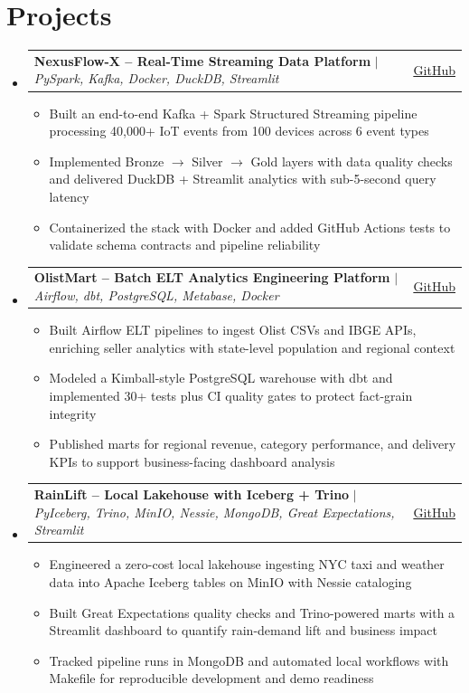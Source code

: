 \documentclass[letterpaper,11pt]{article}
\makeatletter
\newcommand{\resumeItem}[1]{
  \item\small{
    {#1 \vspace{-2pt}}
  }
}
\newcommand{\resumeProjectHeading}[2]{
    \item
    \begin{tabular*}{0.97\textwidth}{l@{\extracolsep{\fill}}r}
      \small#1 & #2 \\
    \end{tabular*}\vspace{-7pt}
}
\newcommand{\resumeSubHeadingListStart}{\begin{itemize}[leftmargin=0.15in, label={}]}
\newcommand{\resumeSubHeadingListEnd}{\end{itemize}}
\newcommand{\resumeItemListStart}{\begin{itemize}[leftmargin=0.18in, itemsep=1pt, topsep=2pt]}
\newcommand{\resumeItemListEnd}{\end{itemize}\vspace{-5pt}}
\makeatother
\begin{document}
\section{Projects}
    \resumeSubHeadingListStart
      \resumeProjectHeading
          {\textbf{NexusFlow-X -- Real-Time Streaming Data Platform} $|$ \emph{PySpark, Kafka, Docker, DuckDB, Streamlit}}{\href{https://github.com/sauravpatel0512}{\underline{GitHub}}}
          \resumeItemListStart
            \resumeItem{Built an end-to-end Kafka + Spark Structured Streaming pipeline processing 40,000+ IoT events from 100 devices across 6 event types}
            \resumeItem{Implemented Bronze $\rightarrow$ Silver $\rightarrow$ Gold layers with data quality checks and delivered DuckDB + Streamlit analytics with sub-5-second query latency}
            \resumeItem{Containerized the stack with Docker and added GitHub Actions tests to validate schema contracts and pipeline reliability}
          \resumeItemListEnd
      \resumeProjectHeading
          {\textbf{OlistMart -- Batch ELT Analytics Engineering Platform} $|$ \emph{Airflow, dbt, PostgreSQL, Metabase, Docker}}{\href{https://github.com/sauravpatel0512}{\underline{GitHub}}}
          \resumeItemListStart
            \resumeItem{Built Airflow ELT pipelines to ingest Olist CSVs and IBGE APIs, enriching seller analytics with state-level population and regional context}
            \resumeItem{Modeled a Kimball-style PostgreSQL warehouse with dbt and implemented 30+ tests plus CI quality gates to protect fact-grain integrity}
            \resumeItem{Published marts for regional revenue, category performance, and delivery KPIs to support business-facing dashboard analysis}
          \resumeItemListEnd
      \resumeProjectHeading
          {\textbf{RainLift -- Local Lakehouse with Iceberg + Trino} $|$ \emph{PyIceberg, Trino, MinIO, Nessie, MongoDB, Great Expectations, Streamlit}}{\href{https://github.com/sauravpatel0512}{\underline{GitHub}}}
          \resumeItemListStart
            \resumeItem{Engineered a zero-cost local lakehouse ingesting NYC taxi and weather data into Apache Iceberg tables on MinIO with Nessie cataloging}
            \resumeItem{Built Great Expectations quality checks and Trino-powered marts with a Streamlit dashboard to quantify rain-demand lift and business impact}
            \resumeItem{Tracked pipeline runs in MongoDB and automated local workflows with Makefile for reproducible development and demo readiness}
          \resumeItemListEnd
    \resumeSubHeadingListEnd

\end{document}
